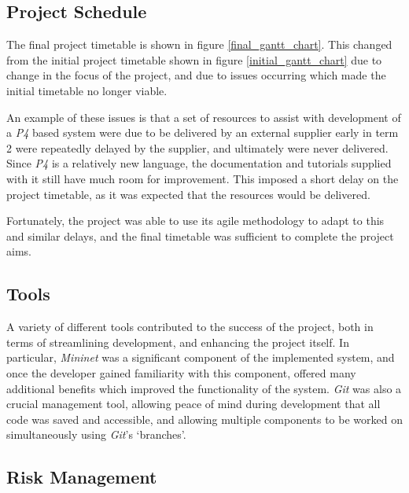 \subsection{Project Schedule}
The final project timetable is shown in figure \ref{final_gantt_chart}. This changed from the initial project timetable shown in figure \ref{initial_gantt_chart} due to change in the focus of the project, and due to issues occurring which made the initial timetable no longer viable.

An example of these issues is that a set of resources to assist with development of a \textit{P4} based system were due to be delivered by an external supplier early in term 2 were repeatedly delayed by the supplier, and ultimately were never delivered.
Since \textit{P4} is a relatively new language, the documentation and tutorials supplied with it still have much room for improvement. This imposed a short delay on the project timetable, as it was expected that the resources would be delivered.

Fortunately, the project was able to use its agile methodology to adapt to this and similar delays, and the final timetable was sufficient to complete the project aims.

\subsection{Tools}
A variety of different tools contributed to the success of the project, both in terms of streamlining development, and enhancing the project itself. In particular, \textit{Mininet} was a significant component of the implemented system, and once the developer gained familiarity with this component, offered many additional benefits which improved the functionality of the system. \textit{Git} was also a crucial management tool, allowing peace of mind during development that all code was saved and accessible, and allowing multiple components to be worked on simultaneously using \textit{Git}'s `branches'.


\subsection{Risk Management}


